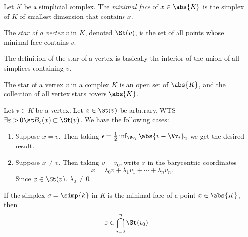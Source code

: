 \begin{definition}
  Let $K$ be a simplicial complex. The \emph{minimal face} of $x \in \abs{K}$ is
  the simplex of $K$ of smallest dimension that contains $x$.
\end{definition}
\begin{definition}
  The \emph{star of a vertex} $v$ in $K$, denoted $\St(v)$, is the set of all
  points whose minimal face contains $v$.
\end{definition}
\begin{remark}
  The definition of the star of a vertex is basically the interior of the union
  of all simplices containing $v$.
\end{remark}
\begin{problem}[15.27]
  The star of a vertex $v$ in a complex $K$ is an open set of $\abs{K}$, and the
  collection of all vertex stars covers $\abs{K}$.
\end{problem}
\begin{solution}
  Let $v \in K$ be a vertex. Let $x \in \St(v)$ be arbitrary. WTS $\exists
  \varepsilon > 0 \st B_{\epsilon}(x) \subset \St(v)$. We have the following
  cases:
  \begin{enumerate}[label=(\arabic*)]
    \item Suppose $x = v$. Then taking $\epsilon = \frac{1}{2} \inf_{\Vv_i}
      \abs{v - \Vv_i}_2$ we get the desired result.
    \item Suppose $x \neq v$. Then taking $v = v_0$, write $x$ in the
      barycentric coordinates
      \[
        x = \lambda_0 v + \lambda_1 v_1 + \cdots + \lambda_n v_n.
      \]
      Since $x \in \St(v)$, $\lambda_0 \neq 0$.
  \end{enumerate}
\end{solution}
\begin{problem}[15.28]
  If the simplex $\sigma = \simp{k}$ in $K$ is the minimal face of a point $x
  \in \abs{K}$, then
  \[
    x \in \bigcap_{i=0}^n \St(v_0)
  \]
\end{problem}
\begin{solution}

\end{solution}
